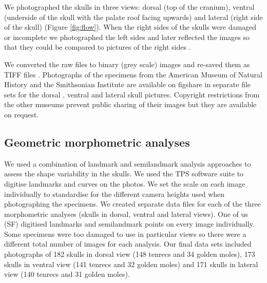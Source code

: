 \documentclass[12pt,a4paper]{article}
\begin{document}
	We photographed the skulls in three views: dorsal (top of the cranium), ventral (underside of the skull with the palate roof facing upwards) and lateral (right side of the skull) (Figure \ref{fig:flow}). When the right sides of the skulls were damaged or incomplete we photographed the left sides and later reflected the images so that they could be compared to pictures of the right sides \citep[e.g.][]{Barrow2008}.
	

	We converted the raw files to binary (grey scale) images and re-saved them as TIFF files \citep[uncompressed files preserve greater detail, ][]{RHOI2013}. 
	Photographs of the specimens from the American Museum of Natural History and the Smithsonian Institute are available on figshare in separate file sets for the dorsal \citep{Finlay2013d}, ventral \citep{Finlay2013v} and lateral \citep{Finlay2013l} skull pictures. Copyright restrictions from the other museums prevent public sharing of their images but they are available on request.

\subsection{Geometric morphometric analyses}

	We used a combination of landmark and semilandmark analysis approaches to assess the shape variability in the skulls.  We used the TPS software suite \citep{Rohlf2013} to digitise landmarks and curves on the photos. We set the scale on each image individually to standardise for the different camera heights used when photographing the specimens. We created separate data files for each of the three morphometric analyses (skulls in dorsal, ventral and lateral views). One of us (SF) digitised landmarks and semilandmark points on every image individually. Some specimens were too damaged to use in particular views so there were a different total number of images for each analysis. Our final data sets included photographs of 182 skulls in dorsal view (148 tenrecs and 34 golden moles), 173 skulls in ventral view (141 tenrecs and 32 golden moles) and 171 skulls in lateral view (140 tenrecs and 31 golden moles).
\end{document}
